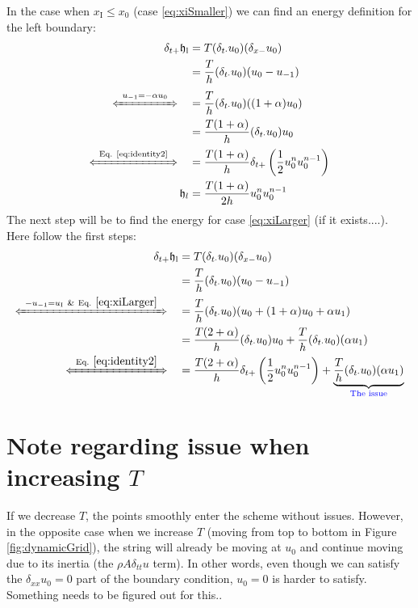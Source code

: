 \documentclass[dvipsnames]{article}
\def\SWcomment[#1]{\textcolor{blue}{#1}}
\def\mystrut{\rule[-.2\baselineskip]{0pt}{\baselineskip}}
\begin{document}
In the case when $x_\text{I} \leq x_0$ (case \eqref{eq:xiSmaller}) we can find an energy definition for the left boundary:
\begin{equation}
    \begin{aligned}
        \delta_{t+}\mathfrak{h}_\text{l} &= T(\delta_{t\cdot}u_0)(\delta_{x-}u_0)\\
        &= \frac{T}{h}(\delta_{t\cdot}u_0)(u_0 - u_{-1})\\[-4pt]
        \xLeftrightarrow{\mystrut\ u_{-1} = -\alpha u_0\ } \quad & = \frac{T}{h}(\delta_{t\cdot}u_0)((1+\alpha)u_0)\\
        &= \frac{T(1+\alpha)}{h}(\delta_{t\cdot}u_0)u_0\\[-5pt]
        \xLeftrightarrow{\mystrut\ \text{Eq. \eqref{eq:identity2}}\ } \quad & = \frac{T(1+\alpha)}{h}\delta_{t+}\left(\frac{1}{2}u_0^nu_0^{n-1}\right)\\
        \mathfrak{h}_l &= \frac{T(1+\alpha)}{2h}u_0^nu_0^{n-1}
    \end{aligned}
\end{equation}
The next step will be to find the energy for case \eqref{eq:xiLarger} (if it exists....). Here follow the first steps:
\begin{equation}
    \begin{aligned}
        \delta_{t+}\mathfrak{h}_\text{l} &= T(\delta_{t\cdot}u_0)(\delta_{x-}u_0)\\
        &= \frac{T}{h}(\delta_{t\cdot}u_0)(u_0 - u_{-1})\\[-5pt]
        \xLeftrightarrow{\mystrut\ -u_{-1} = u_\text{I}\ \text{\&} \ \text{Eq. } \eqref{eq:xiLarger}\ } \quad & = \frac{T}{h}(\delta_{t\cdot}u_0)(u_0 + (1+\alpha) u_0 + \alpha u_1)\\
        &= \frac{T(2+\alpha)}{h}(\delta_{t\cdot}u_0)u_0 + \frac{T}{h}(\delta_{t\cdot}u_0)(\alpha u_1)\\[-5pt]
        \xLeftrightarrow{\mystrut\ \text{Eq. }\eqref{eq:identity2}\ } \quad &= \frac{T(2+\alpha)}{h}\delta_{t+}\left(\frac{1}{2}u_0^nu_0^{n-1}\right) + \underbrace{\frac{T}{h}(\delta_{t\cdot}u_0)(\alpha u_1)}_{\text{\SWcomment[The issue]}} 
    \end{aligned}
\end{equation}



\appendix
\section{Note regarding issue when increasing $T$}
If we decrease $T$, the points smoothly enter the scheme without issues. However, in the opposite case when we increase $T$ (moving from top to bottom in Figure \ref{fig:dynamicGrid}), the string will already be moving at $u_0$ and continue moving due to its inertia (the $\rho A \delta_{tt}u$ term). In other words, even though we can satisfy the $\delta_{xx}u_0 = 0$ part of the boundary condition, $u_0=0$ is harder to satisfy. Something needs to be figured out for this..
\end{document}
